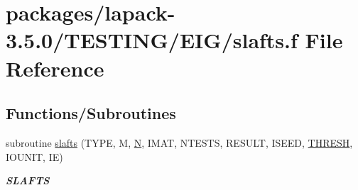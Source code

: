 \hypertarget{slafts_8f}{}\section{packages/lapack-\/3.5.0/\+T\+E\+S\+T\+I\+N\+G/\+E\+I\+G/slafts.f File Reference}
\label{slafts_8f}
\subsection*{Functions/\+Subroutines}
\begin{DoxyCompactItemize}
\item 
subroutine \hyperlink{group__single__eig_gac380bedffc2273fb83d72d857a28876a}{slafts} (T\+Y\+P\+E, M, \hyperlink{polmisc_8c_a0240ac851181b84ac374872dc5434ee4}{N}, I\+M\+A\+T, N\+T\+E\+S\+T\+S, R\+E\+S\+U\+L\+T, I\+S\+E\+E\+D, \hyperlink{zlaqgs_8c_a0656018abfc9fa2821827415f5d5ea57}{T\+H\+R\+E\+S\+H}, I\+O\+U\+N\+I\+T, I\+E)
\begin{DoxyCompactList}\small\item\em {\bfseries S\+L\+A\+F\+T\+S} \end{DoxyCompactList}\end{DoxyCompactItemize}
